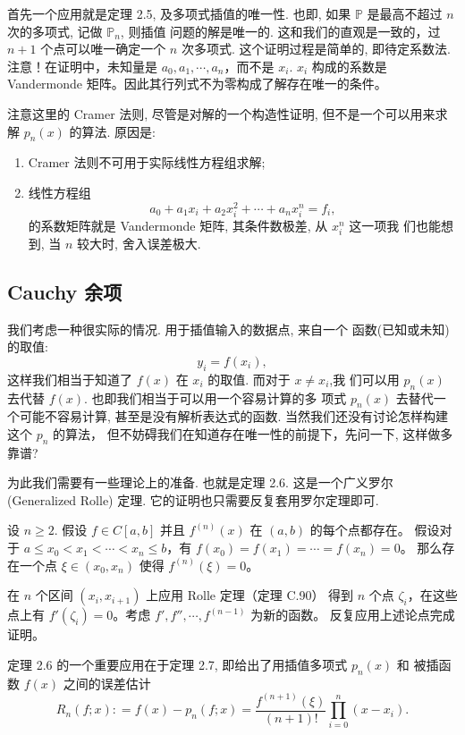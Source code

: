 \documentclass[a4paper]{ctexart}
\newcommand{\remark}[1]
{\noindent {\bf Remark {#1}}}
\begin{document}
首先一个应用就是定理 2.5, 及多项式插值的唯一性. 也即, 如果
$\mathbb{P}$ 是最高不超过 $n$ 次的多项式, 记做 $\mathbb{P}_n$, 则插值
问题的解是唯一的. 这和我们的直观是一致的，过 $n + 1$ 个点可以唯一确定一个 $n$ 次多项式.
这个证明过程是简单的, 即待定系数法. 注意！在证明中，未知量是 $a_0, a_1, \cdots, a_n$，而不是 $x_i$.
$x_i$ 构成的系数是 Vandermonde 矩阵。因此其行列式不为零构成了解存在唯一的条件。

注意这里的 Cramer 法则, 尽管是对解的一个构造性证明, 但不是一个可以用来求解 $p_n(x)$ 的算法. 
原因是:
\begin{enumerate}
\item Cramer 法则不可用于实际线性方程组求解;
\item 线性方程组
  $$
  a_0 + a_1 x_i + a_2 x_i^2 + \cdots + a_n x_i^n = f_i,
  $$
  的系数矩阵就是 Vandermonde 矩阵, 其条件数极差, 从 $x_i^n$ 这一项我
  们也能想到, 当 $n$ 较大时, 舍入误差极大. 
\end{enumerate}

\subsection{Cauchy 余项}
\remark{2.4} 我们考虑一种很实际的情况. 用于插值输入的数据点, 来自一个
函数(已知或未知)的取值:
$$
y_i = f(x_i),
$$
这样我们相当于知道了 $f(x)$ 在 $x_i$ 的取值. 而对于 $x \neq x_i$,我
们可以用 $p_n(x)$ 去代替 $f(x)$. 也即我们相当于可以用一个容易计算的多
项式 $p_n(x)$ 去替代一个可能不容易计算, 甚至是没有解析表达式的函数. 
当然我们还没有讨论怎样构建这个 $p_n$ 的算法，
但不妨碍我们在知道存在唯一性的前提下，先问一下, 这样做多靠谱?

为此我们需要有一些理论上的准备. 也就是定理 2.6. 这是一个广义罗尔
(Generalized Rolle) 定理. 它的证明也只需要反复套用罗尔定理即可.

 设 $n \geq 2$. 
假设 $f \in C [a, b]$ 并且 $f^{(n)} (x)$ 在 $(a, b)$ 的每个点都存在。
假设对于 $a \leq x_0 < x_1 < \cdots < x_n \leq b$，有 $f (x_0) = f (x_1 ) = \cdots = f (x_n ) = 0$。
那么存在一个点 $\xi \in (x_0, x_n )$ 使得 $f^{(n)} (\xi) = 0$。

 在 $n$ 个区间 $(x_i , x_{i+1} )$ 上应用 Rolle 定理（定理 C.90）
得到 $n$ 个点 $\zeta_i$，在这些点上有 $f' (\zeta_i ) = 0$。考虑 $f' , f'' , \cdots , f^{(n-1)}$ 为新的函数。
反复应用上述论点完成证明。

定理 2.6 的一个重要应用在于定理 2.7, 即给出了用插值多项式 $p_n(x)$ 和
被插函数 $f(x)$ 之间的误差估计
$$
R_n(f; x) : = f(x) - p_n(f; x)
= \frac{f^{(n + 1)}(\xi)}{(n + 1)!} \prod_{i = 0}^n (x - x_i).
$$
\end{document}
